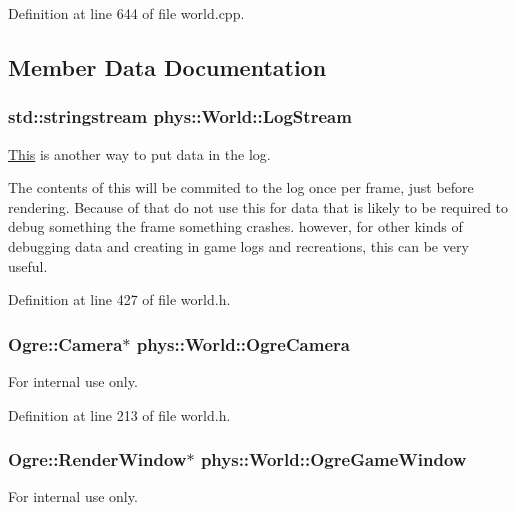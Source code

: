 Definition at line 644 of file world.cpp.



\subsection{Member Data Documentation}
\hypertarget{classphys_1_1World_a6d8b325a077afc924afb70c259ec0299}{
\subsubsection[{LogStream}]{\setlength{\rightskip}{0pt plus 5cm}std::stringstream {\bf phys::World::LogStream}}}
\label{da/ddf/classphys_1_1World_a6d8b325a077afc924afb70c259ec0299}


\hyperlink{structThis}{This} is another way to put data in the log. 

The contents of this will be commited to the log once per frame, just before rendering. Because of that do not use this for data that is likely to be required to debug something the frame something crashes. however, for other kinds of debugging data and creating in game logs and recreations, this can be very useful. 

Definition at line 427 of file world.h.

\hypertarget{classphys_1_1World_a116475cb7c43e61e2e0cb04606282426}{
\subsubsection[{OgreCamera}]{\setlength{\rightskip}{0pt plus 5cm}Ogre::Camera$\ast$ {\bf phys::World::OgreCamera}}}
\label{da/ddf/classphys_1_1World_a116475cb7c43e61e2e0cb04606282426}
\begin{DoxyInternal}{For internal use only.}
\end{DoxyInternal}


Definition at line 213 of file world.h.

\hypertarget{classphys_1_1World_a66053249b1d5d177595f229d339f5122}{
\subsubsection[{OgreGameWindow}]{\setlength{\rightskip}{0pt plus 5cm}Ogre::RenderWindow$\ast$ {\bf phys::World::OgreGameWindow}}}
\label{da/ddf/classphys_1_1World_a66053249b1d5d177595f229d339f5122}
\begin{DoxyInternal}{For internal use only.}
\end{DoxyInternal}


